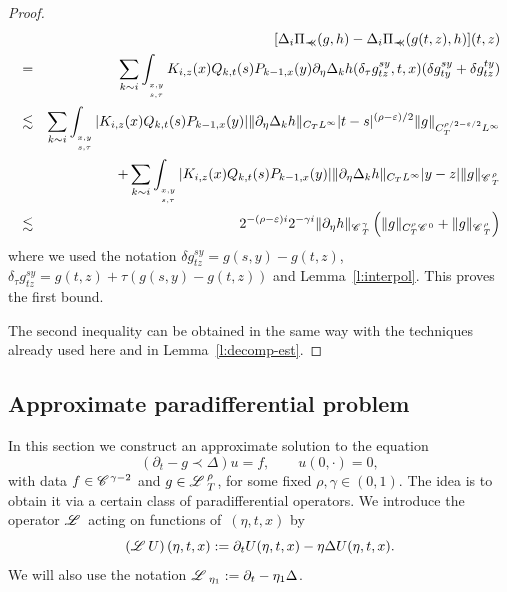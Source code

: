 \documentclass{amsart}
\newcommand{\assign}{:=}
\newcommand{\precprec}{\prec\!\!\!\prec}
\theoremstyle{remark}
\theoremstyle{definition}
\newcommand{\CC}{\mathscr{C} \hspace{.1em}}
\newcommand{\LL}{\mathscr{L} \hspace{.2em}}
\begin{document}
\begin{proof}
  
  \begin{eqnarray*}
    &  & [\Delta_i \Pi_{\precprec} (g, h) - \Delta_i \Pi_{\precprec} (g (t,
    z), h)] (t, z)\\
    & = & \sum_{\underset{}{k \sim i}} \int_{_{\underset{s, \tau}{x, y}}}
    K_{i, z} (x) Q_{k, t} (s) P_{k - 1, x} (y) \partial_{\eta} \Delta_k h
    (\delta_{\tau} g^{s y}_{t z}, t, x) (\delta g^{s y}_{t y} + \delta g^{t
    y}_{t z})\\
    & \lesssim & \sum_{\underset{}{k \sim i}} \int_{_{\underset{s, \tau}{x,
    y}}} | K_{i, z} (x) Q_{k, t} (s) P_{k - 1, x} (y) | \| \partial_{\eta}
    \Delta_k h \|_{C_T L^{\infty}} | t - s |^{(\rho - \varepsilon) / 2} \| g
    \|_{C^{\rho / 2 - \varepsilon / 2}_T L^{\infty}}\\
    &  & + \sum_{\underset{}{k \sim i}} \int_{_{\underset{s, \tau}{x, y}}} |
    K_{i, z} (x) Q_{k, t} (s) P_{k - 1, x} (y) | \| \partial_{\eta} \Delta_k h
    \|_{C_T L^{\infty}} | y - z | \| g \|_{\CC^{\rho}_T}\\
    & \lesssim & 2^{- (\rho - \varepsilon) i} 2^{- \gamma i} \|
    \partial_{\eta} h \|_{\CC^{\gamma}_T} \left( \| g \|_{C^{\rho}_T \CC^0} +
    \| g \|_{\CC^{\rho}_T} \right)
  \end{eqnarray*}
  where we used the notation $\delta g^{s y}_{t z} = g (s, y) - g (t, z)$,
  $\delta_{\tau} g^{s y}_{t z} = g (t, z) + \tau (g (s, y) - g (t, z))$ and
  Lemma~\ref{l:interpol}. This proves the first bound.
  
  The second inequality can be obtained in the same way with the techniques
  already used here and in Lemma~\ref{l:decomp-est}.
\end{proof}

\subsection{Approximate paradifferential problem}\label{s:approx-paradiff}

In this section we construct an approximate solution to the equation
\begin{equation}
  (\partial_t - g \prec \Delta) u = f, \qquad u (0, \cdot) = 0,
  \label{e:paradiff}
\end{equation}
with data $f \in \CC^{\gamma - 2}$ and $g \in \LL^{\rho}_T$, for some fixed
$\rho, \gamma \in (0, 1)$. The idea is to obtain it via a certain class of
paradifferential operators. We introduce the operator $\LL$ acting on
functions of~$(\eta, t, x)$ by
\begin{equation}
  \left( \LL U \right) (\eta, t, x) \assign \partial_t U (\eta, t, x) - \eta
  \Delta U (\eta, t, x) . \label{e:def-Loper}
\end{equation}
We will also use the notation $\LL_{\eta_1} \assign \partial_t - \eta_1
\Delta$. \
\end{document}
